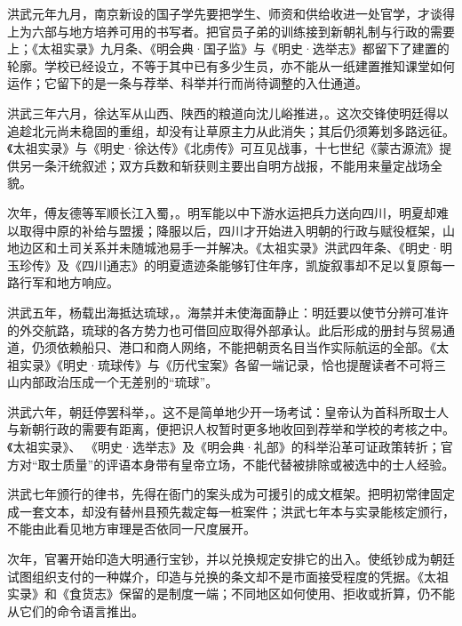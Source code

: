 洪武元年九月，南京新设的国子学先要把学生、师资和供给收进一处官学，才谈得上为六部与地方培养可用的书写者。把官员子弟的训练接到新朝礼制与行政的需要上；《太祖实录》九月条、《明会典·国子监》与《明史·选举志》都留下了建置的轮廓。学校已经设立，不等于其中已有多少生员，亦不能从一纸建置推知课堂如何运作；它留下的是一条与荐举、科举并行而尚待调整的入仕通道。

洪武三年六月，徐达军从山西、陕西的粮道向沈儿峪推进，。这次交锋使明廷得以追趁北元尚未稳固的重组，却没有让草原主力从此消失；其后仍须筹划多路远征。《太祖实录》与《明史·徐达传》《北虏传》可互见战事，十七世纪《蒙古源流》提供另一条汗统叙述；双方兵数和斩获则主要出自明方战报，不能用来量定战场全貌。

次年，傅友德等军顺长江入蜀，。明军能以中下游水运把兵力送向四川，明夏却难以取得中原的补给与盟援；降服以后，四川才开始进入明朝的行政与赋役框架，山地边区和土司关系并未随城池易手一并解决。《太祖实录》洪武四年条、《明史·明玉珍传》及《四川通志》的明夏遗迹条能够钉住年序，凯旋叙事却不足以复原每一路行军和地方响应。

洪武五年，杨载出海抵达琉球，。海禁并未使海面静止：明廷要以使节分辨可准许的外交航路，琉球的各方势力也可借回应取得外部承认。此后形成的册封与贸易通道，仍须依赖船只、港口和商人网络，不能把朝贡名目当作实际航运的全部。《太祖实录》《明史·琉球传》与《历代宝案》各留一端记录，恰也提醒读者不可将三山内部政治压成一个无差别的“琉球”。

洪武六年，朝廷停罢科举，。这不是简单地少开一场考试：皇帝认为首科所取士人与新朝行政的需要有距离，便把识人权暂时更多地收回到荐举和学校的考核之中。《太祖实录》、 《明史·选举志》及《明会典·礼部》的科举沿革可证政策转折；官方对“取士质量”的评语本身带有皇帝立场，不能代替被排除或被选中的士人经验。

洪武七年颁行的律书，先得在衙门的案头成为可援引的成文框架。把明初常律固定成一套文本，却没有替州县预先裁定每一桩案件；洪武七年本与实录能核定颁行，不能由此看见地方审理是否依同一尺度展开。

次年，官署开始印造大明通行宝钞，并以兑换规定安排它的出入。使纸钞成为朝廷试图组织支付的一种媒介，印造与兑换的条文却不是市面接受程度的凭据。《太祖实录》和《食货志》保留的是制度一端；不同地区如何使用、拒收或折算，仍不能从它们的命令语言推出。

